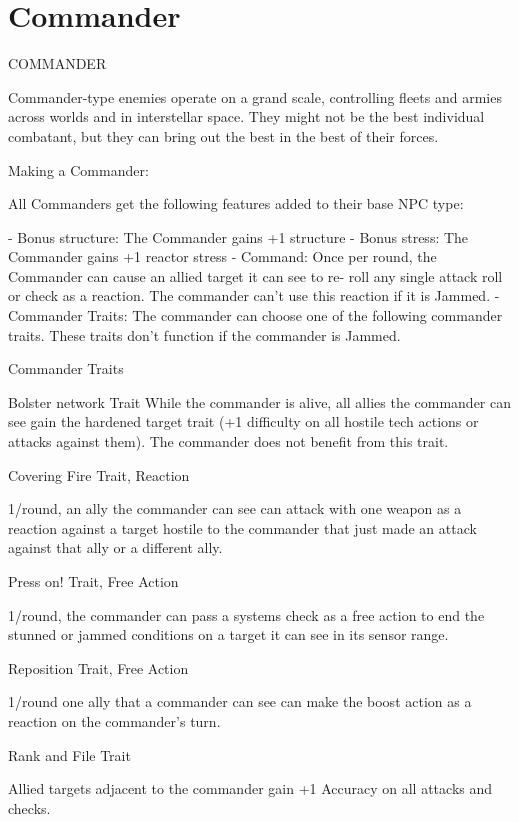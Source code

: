 \section{Commander}
                                              COMMANDER   

Commander-type enemies operate on a grand scale, controlling fleets and armies across worlds  
and in interstellar space. They might not be the best individual combatant, but they can bring out  
the best in the best of their forces.   

Making a Commander:
 
All Commanders get the following features added to their base NPC type:
 
    -    Bonus structure: The Commander gains +1 structure  
    -    Bonus stress: The Commander gains +1 reactor stress  
    -    Command: Once per round, the Commander can cause an allied target it can see to re- 
         roll any single attack roll or check as a reaction. The commander can’t use this reaction if  
         it is Jammed.  
    -    Commander Traits: The commander can choose one of the following commander traits.  
         These traits don’t function if the commander is Jammed.  

Commander Traits
 
Bolster network  
Trait  
While the commander is alive, all allies the commander can see gain the hardened target trait (+1  
difficulty on all hostile tech actions or attacks against them). The commander does not benefit  
from this trait.
 

Covering Fire  
Trait, Reaction
 
1/round, an ally the commander can see can attack with one weapon as a reaction against a  
target hostile to the commander that just made an attack against that ally or a different ally.
 

Press on!  
Trait, Free Action
 
1/round, the commander can pass a systems check as a free action to end the stunned or  
jammed conditions on a target it can see in its sensor range.
 

Reposition  
Trait, Free Action
 
1/round one ally that a commander can see can make the boost action as a reaction on the  
commander’s turn.
 

Rank and File  
Trait
 
Allied targets adjacent to the commander gain +1 Accuracy on all attacks and checks.
 